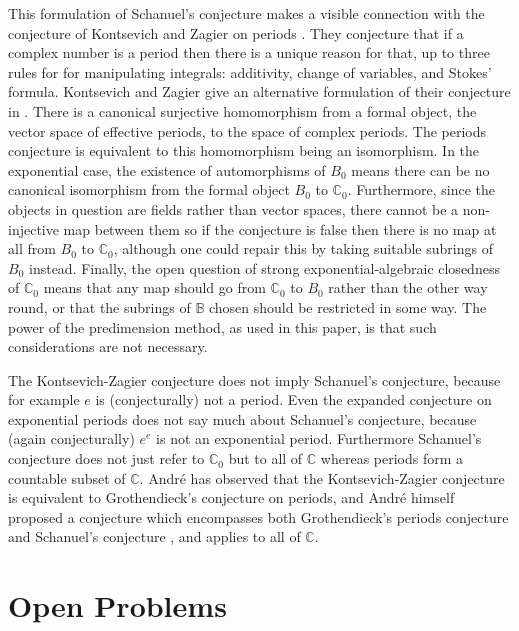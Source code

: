 \documentclass[12pt]{amsart}
\theoremstyle{definition}
\begin{document}
This formulation of Schanuel's conjecture makes a visible connection with the conjecture of Kontsevich and Zagier on periods \cite[\S1.2]{KZ_Periods}. They conjecture that if a complex number is a period then there is a unique reason for that, up to three rules for for manipulating integrals: additivity, change of variables, and Stokes' formula. Kontsevich and Zagier give an alternative formulation of their conjecture in \cite[\S4.1]{KZ_Periods}. There is a canonical surjective homomorphism from a formal object, the vector space of effective periods, to the space of complex periods. The periods conjecture is equivalent to this homomorphism being an isomorphism. In the exponential case, the existence of automorphisms of $B_0$ means there can be no canonical isomorphism from the formal object $B_0$ to ${\ensuremath{\mathbb{C}}}_0$. Furthermore, since the objects in question are fields rather than vector spaces, there cannot be a non-injective map between them so if the conjecture is false then there is no map at all from $B_0$ to ${\ensuremath{\mathbb{C}}}_0$, although one could repair this by taking suitable subrings of $B_0$ instead. Finally, the open question of strong exponential-algebraic closedness of ${\ensuremath{\mathbb{C}}}_0$ means that any map should go from ${\ensuremath{\mathbb{C}}}_0$ to $B_0$ rather than the other way round, or that the subrings of ${\ensuremath{\mathbb{B}}}$ chosen should be restricted in some way. The power of the predimension method, as used in this paper, is that such considerations are not necessary.

The Kontsevich-Zagier conjecture does not imply Schanuel's conjecture, because for example $e$ is (conjecturally) not a period. Even the expanded conjecture on exponential periods \cite[\S4.3]{KZ_Periods} does not say much about Schanuel's conjecture, because (again conjecturally) $e^e$ is not an exponential period. Furthermore Schanuel's conjecture does not just refer to ${\ensuremath{\mathbb{C}}}_0$ but to all of ${\ensuremath{\mathbb{C}}}$ whereas periods form a countable subset of ${\ensuremath{\mathbb{C}}}$. Andr\'e has observed \cite[\S4.4]{Andre09} that the Kontsevich-Zagier conjecture is equivalent to Grothendieck's conjecture on periods, and Andr\'e himself proposed a conjecture which encompasses both Grothendieck's periods conjecture and Schanuel's conjecture \cite[\S5.8.1]{Andre09}, and applies to all of ${\ensuremath{\mathbb{C}}}$.

\section{Open Problems}
\end{document}
